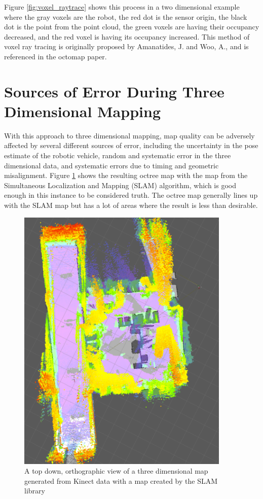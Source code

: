 \documentclass[12pt]{report}
\begin{document}
Figure \ref{fig:voxel_raytrace} shows this process in a two dimensional example where the gray voxels are the robot, the red dot is the sensor origin, the black dot is the point from the point cloud, the green voxels are having their occupancy decreased, and the red voxel is having its occupancy increased. This method of voxel ray tracing is originally proposed by Amanatides, J. and Woo, A., and is referenced in the octomap paper\cite{amanatides1987fast}.

\section{Sources of Error During Three Dimensional Mapping}
With this approach to three dimensional mapping, map quality can be adversely affected by several different sources of error, including the uncertainty in the pose estimate of the robotic vehicle, random and systematic error in the three dimensional data, and systematic errors due to timing and geometric misalignment.  Figure \ref{fig:slamvsoctree} shows the resulting octree map with the map from the Simultaneous Localization and Mapping (SLAM) algorithm, which is good enough in this instance to be considered truth. The octree map generally lines up with the SLAM map but has a lot of areas where the result is less than desirable.

\begin{figure}[ht]
  \centering
  \includegraphics[width=4in,keepaspectratio]{slamvsoctree.pdf}
  \caption{A top down, orthographic view of a three dimensional map generated from Kinect data with a map created by the SLAM library}
  \label{fig:slamvsoctree}
\end{figure}
\end{document}
